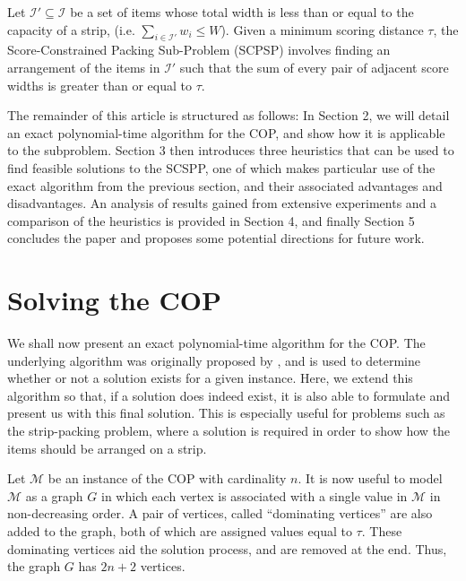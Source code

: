 \documentclass[runningheads]{llncs}
\begin{document}
\begin{definition}
	\label{defn:subprob}
	Let $\mathcal{I}' \subseteq \mathcal{I}$ be a set of items whose total width is less than or equal to the capacity of a strip, (i.e. $\sum_{i\in \mathcal{I}'}w_i \leq W$). Given a minimum scoring distance $\tau$, the Score-Constrained Packing Sub-Problem (SCPSP) involves finding an arrangement of the items in $\mathcal{I}'$ such that the sum of every pair of adjacent score widths is greater than or equal to $\tau$.
\end{definition}


The remainder of this article is structured as follows: In Section 2, we will detail an exact polynomial-time algorithm for the COP, and show how it is applicable to the subproblem. Section 3 then introduces three heuristics that can be used to find feasible solutions to the SCSPP, one of which makes particular use of the exact algorithm from the previous section, and their associated advantages and disadvantages. An analysis of results gained from extensive experiments and a comparison of the heuristics is provided in Section 4, and finally Section 5 concludes the paper and proposes some potential directions for future work.

\section{Solving the COP}
\label{sec:ahca}
We shall now present an exact polynomial-time algorithm for the COP. The underlying algorithm was originally proposed by \cite{becker2010}, and is used to determine whether or not a solution exists for a given instance. Here, we extend this algorithm so that, if a solution does indeed exist, it is also able to formulate and present us with this final solution. This is especially useful for problems such as the strip-packing problem, where a solution is required in order to show how the items should be arranged on a strip.

Let $\mathcal{M}$ be an instance of the COP with cardinality $n$. It is now useful to model $\mathcal{M}$ as a graph $G$ in which each vertex is associated with a single value in $\mathcal{M}$ in non-decreasing order. A pair of vertices, called ``dominating vertices'' are also added to the graph, both of which are assigned values equal to $\tau$. These dominating vertices aid the solution process, and are removed at the end. Thus, the graph $G$ has $2n+2$ vertices.
\end{document}
